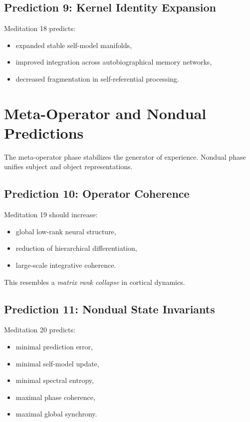 \documentclass[12pt]{article}
\begin{document}
\section{Prediction 9: Kernel Identity Expansion}

Meditation 18 predicts:

\begin{itemize}
\item expanded stable self-model manifolds,
\item improved integration across autobiographical memory networks,
\item decreased fragmentation in self-referential processing.
\end{itemize}


\newpage


\chapter{Meta-Operator and Nondual Predictions}

The meta-operator phase stabilizes the generator of experience.
Nondual phase unifies subject and object representations.

\section{Prediction 10: Operator Coherence}

Meditation 19 should increase:

\begin{itemize}
\item global low-rank neural structure,
\item reduction of hierarchical differentiation,
\item large-scale integrative coherence.
\end{itemize}

This resembles a \emph{matrix rank collapse} in cortical dynamics.

\section{Prediction 11: Nondual State Invariants}

Meditation 20 predicts:

\begin{itemize}
\item minimal prediction error,
\item minimal self-model update,
\item minimal spectral entropy,
\item maximal phase coherence,
\item maximal global synchrony.
\end{itemize}
\end{document}
